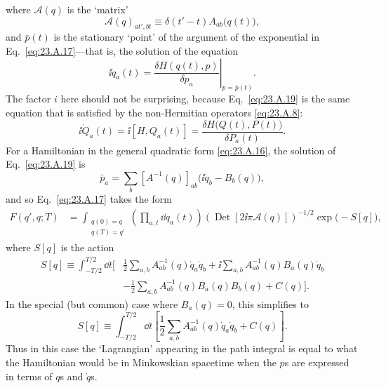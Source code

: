 where $\mathcal A(q)$ is the `matrix'
\begin{equation}
 \mathcal A(q)_{at',bt}\equiv\delta(t'-t)A_{ab}\bigl(q(t)\bigr),
 \tag{23.A.18}\label{eq:23.A.18}
\end{equation}
and $\bar p(t)$ is the stationary `point' of the argument of the exponential in Eq.~\eqref{eq:23.A.17}---that is, the solution of the equation
\begin{equation}
 \ii\dot q_a(t)
 =\left.
 \frac{\delta H(q(t),p)}{\delta p_a}
 \right|_{p=\bar p(t)}.
 \tag{23.A.19}\label{eq:23.A.19}
\end{equation}
The factor $i$ here should not be surprising, because Eq.~\eqref{eq:23.A.19} is the same equation that is satisfied by the non-Hermitian operators \eqref{eq:23.A.8}:
\[
 \ii\dot Q_a(t)=\ii[H,Q_a(t)]
 =\frac{\delta H\bigl(Q(t),P(t)\bigr)}{\delta P_a(t)}.
\]
For a Hamiltonian in the general quadratic form \eqref{eq:23.A.16}, the solution of Eq.~\eqref{eq:23.A.19} is
\begin{equation}
 \bar p_a=\sum_b\left[A^{-1}(q)\right]_{ab}
 \bigl(\ii\dot q_b-B_b(q)\bigr),
 \tag{23.A.20}\label{eq:23.A.20}
\end{equation}
and so Eq.~\eqref{eq:23.A.17} takes the form
\begin{equation}
\begin{aligned}
 F(q',q;T)
 &=
 \int_{\substack{q(0)=q\\q(T)=q'}}
 \left(\prod_{a,t}\dd q_a(t)\right)
 \left(\operatorname{Det}\left[2\ii\pi\mathcal A(q)\right]\right)^{-1/2}
 \exp\bigl(-S[q]\bigr),
\end{aligned}
 \tag{23.A.21}\label{eq:23.A.21}
\end{equation}
where $S[q]$ is the action
\begin{equation}
\begin{aligned}
 S[q]\equiv\int_{-T/2}^{T/2}\dd t\biggl[
 &\frac{1}{2}\sum_{a,b}A^{-1}_{ab}(q)\dot q_a\dot q_b
 +\ii\sum_{a,b}A^{-1}_{ab}(q)B_a(q)\dot q_b\\
 &-\frac{1}{2}\sum_{a,b}A^{-1}_{ab}(q)B_a(q)B_b(q)+C(q)
 \biggr].
\end{aligned}
 \tag{23.A.22}\label{eq:23.A.22}
\end{equation}
In the special (but common) case where $B_a(q)=0$, this simplifies to
\begin{equation}
 S[q]\equiv\int_{-T/2}^{T/2}\dd t
 \left[
 \frac{1}{2}\sum_{a,b}A^{-1}_{ab}(q)\dot q_a\dot q_b+C(q)
 \right].
 \tag{23.A.23}\label{eq:23.A.23}
\end{equation}
Thus in this case the `Lagrangian' appearing in the path integral is equal to what the Hamiltonian would be in Minkowskian spacetime when the $p$s are expressed in terms of $q$s and $\dot q$s.
